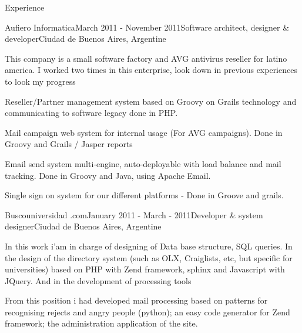 \documentclass{resume} %
\begin{document}
\begin{rSection}{Experience}
\begin{rSubsection}{Aufiero Informatica}{March 2011 - November 2011}{Software architect, designer \& developer}{Ciudad de Buenos Aires, Argentine}
\item This company is a small software factory and AVG antivirus reseller for latino america. I worked two times in this enterprise, look down in previous experiences to look my progress
\item Reseller/Partner management system based on Groovy on Grails technology and communicating to software legacy done in PHP.
\item Mail campaign web system for internal usage (For AVG campaigns). Done in Groovy and Grails / Jasper reports
\item Email send system multi-engine, auto-deployable with load balance and mail tracking. Done in Groovy and Java, using Apache Email. 
\item Single sign on system for our different platforms - Done in Groove and grails.
\end{rSubsection}


\begin{rSubsection}{Buscouniversidad .com}{January 2011 -  March - 2011}{Developer \& system designer}{Ciudad de Buenos Aires, Argentine}
\item In this work i'am in charge of designing of Data base structure, SQL queries. In the design of the directory system (such as OLX, Craiglists, etc, but specific for universities)  based on PHP with Zend framework, sphinx and Javascript with JQuery.  And in the development of processing tools
\item From this position i had developed mail processing based on patterns for recognising rejects and angry people (python); an easy code generator for Zend framework; the administration application of the site. 
\end{rSubsection}



\end{rSection}
\end{document}
